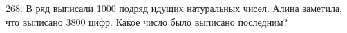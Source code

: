 268. В ряд выписали 1000 подряд идущих натуральных чисел. Алина заметила, что выписано 3800 цифр. Какое число было выписано последним?\\
